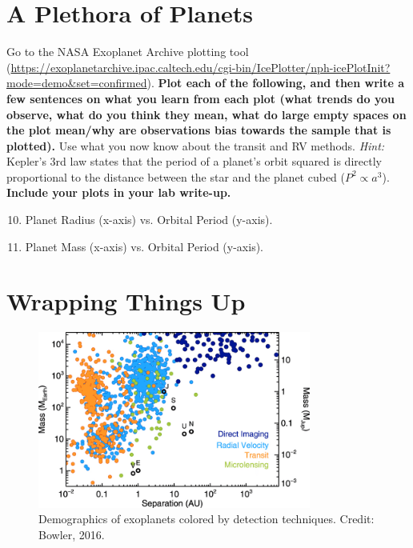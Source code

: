 \documentclass[11pt]{article}
\begin{document}
\section{A Plethora of Planets}
Go to the NASA Exoplanet Archive plotting tool (\url{https://exoplanetarchive.ipac.caltech.edu/cgi-bin/IcePlotter/nph-icePlotInit?mode=demo&set=confirmed}).  \textbf{Plot each of the following, and then write a few sentences on what you learn from each plot (what trends do you observe, what do you think they mean, what do large empty spaces on the plot mean/why are observations bias towards the sample that is plotted).}  Use what you now know about the transit and RV methods. \textit{Hint:} Kepler's 3rd law states that the period of a planet's orbit squared is directly proportional to the distance between the star and the planet cubed ($P^2 \propto a^3$). \textbf{Include your plots in your lab write-up.} 
    \begin{enumerate}
    \setcounter{enumi}{9}
        \item Planet Radius (x-axis) vs. Orbital Period (y-axis). %
        \item Planet Mass (x-axis) vs. Orbital Period (y-axis). %
    \end{enumerate}


\newpage
\section{Wrapping Things Up}

\begin{figure}[h!]
    \centering
    \includegraphics[width=0.8\textwidth]{Images/Exoplanet Demographic Techniques.png}
    \caption{Demographics of exoplanets colored by detection techniques. Credit: Bowler, 2016.}
    \label{fig:techniques}
\end{figure}
\end{document}
